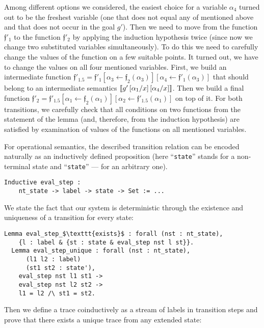 Among different options we considered, the easiest choice for a variable $\alpha_4$ turned out to be the freshest variable (one that does not equal any of mentioned above and that does not occur in the goal $g'$). Then we need to move from the function ${\mathfrak f'_1}$ to the function ${\mathfrak f'_2}$ by applying the induction hypothesis twice (since now we change two substituted variables simultaneously). To do this we need to carefully change the values of the function on a few suitable points. It turned out, we have to change the values on all four mentioned variables. First, we build an intermediate function ${\mathfrak f'_{1.5}} = {\mathfrak f'_1}[\alpha_3\gets {\mathfrak f_2}(\alpha_3)][\alpha_4\gets {\mathfrak f'_1}(\alpha_3)]$ that should belong to an intermediate semantics $\llbracket{g'\,[\alpha_1/x]\,[\alpha_4/x]}\rrbracket$. Then we build a final function ${\mathfrak f'_2} = {\mathfrak f'_{1.5}}[\alpha_1\gets {\mathfrak f_2}(\alpha_1)][\alpha_2\gets {\mathfrak f'_{1.5}}(\alpha_1)]$ on top of it. For both transitions, we carefully check that all conditions on two functions from the statement of the lemma (and, therefore, from the induction hypothesis) are satisfied by examination of values of the functions on all mentioned variables.

For operational semantics, the described transition relation can be encoded naturally as an inductively defined proposition (here ``\lstinline|state|''
stands for a non-terminal state and ``\lstinline|state|'' --- for an arbitrary one).

\begin{lstlisting}[language=Coq]
  Inductive eval_step :
    nt_state -> label -> state -> Set := ...
\end{lstlisting}

We state the fact that our system is deterministic through the existence and uniqueness of a transition for every state:

\begin{lstlisting}[language=Coq]
  Lemma eval_step_$\texttt{exists}$ : forall (nst : nt_state),
    {l : label & {st : state & eval_step nst l st}}.
  Lemma eval_step_unique : forall (nst : nt_state),
      (l1 l2 : label)
      (st1 st2 : state'),
    eval_step nst l1 st1 ->
    eval_step nst l2 st2 ->
    l1 = l2 /\ st1 = st2.
\end{lstlisting}

Then we define a trace coinductively as a stream of labels in transition steps and prove that there exists a unique trace from any extended state:

